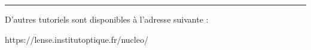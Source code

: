 \documentclass[a4paper,11pt,titlepage]{article} %
\begin{document}
\bigskip


\noindent \rule{\linewidth}{1pt}

\begin{center}
\Large
D'autres tutoriels sont disponibles à l'adresse suivante :

https://lense.institutoptique.fr/nucleo/
\end{center}

\newpage

\end{document}
